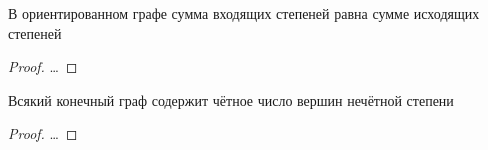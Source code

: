 \documentclass[a4paper, 14pt]{article}
\begin{document}
    \begin{lemma}
        В ориентированном графе сумма входящих степеней равна сумме исходящих степеней
    \end{lemma}
    \begin{proof}
        \dots
    \end{proof}

    \begin{lemma}
        Всякий конечный граф содержит чётное число вершин нечётной степени
    \end{lemma}
    \begin{proof}
        \dots
    \end{proof}


    
\end{document}
